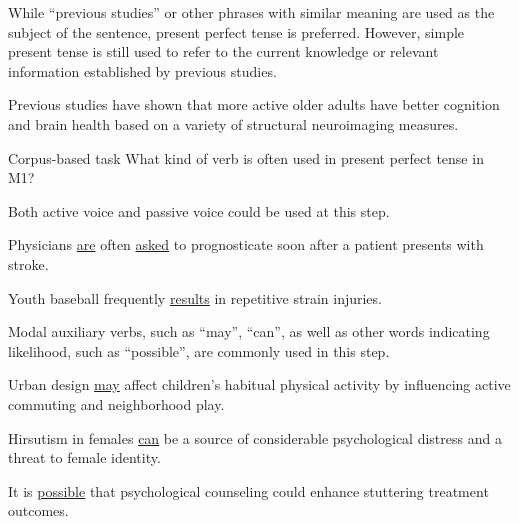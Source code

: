\documentclass[a4paper]{ctexbook}
\begin{document}
    While ``previous studies'' or other phrases with similar meaning are used as the subject of the sentence, present perfect tense is preferred. However, simple present tense is still used to refer to the current knowledge or relevant information established by previous studies.

    \begin{eg}[label={myautocounter}]{}
      Previous studies have shown that more active older adults have better cognition and brain health based on a variety of structural neuroimaging measures.
    \end{eg}

    \begin{task}[label={myautocounter}]{\heiti Corpus-based task}
      What kind of verb is often used in present perfect tense in M1?
    \end{task}

    Both active voice and passive voice could be used at this step.

    \begin{eg}[label={myautocounter}]{}
      Physicians \uline{are} often \uline{asked} to prognosticate soon after a patient presents with stroke.
    \end{eg}

    \begin{eg}[label={myautocounter}]{}
      Youth baseball frequently \uline{results} in repetitive strain injuries.
    \end{eg}

    Modal auxiliary verbs, such as ``may'', ``can'', as well as other words indicating likelihood, such as ``possible'', are commonly used in this step.

    \begin{eg}[label={myautocounter}]{}
      Urban design \uline{may} affect children's habitual physical activity by influencing active commuting and neighborhood play.
    \end{eg}

    \begin{eg}[label={myautocounter}]{}
      Hirsutism in females \uline{can} be a source of considerable psychological distress and a threat to female identity.
    \end{eg}

    \begin{eg}[label={myautocounter}]{}
      It is \uline{possible} that psychological counseling could enhance stuttering treatment outcomes.
    \end{eg}
\end{document}
